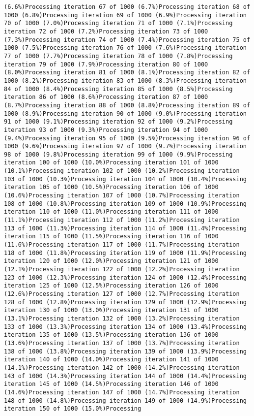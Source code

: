 \documentclass[
]{article}
\begin{document}
\begin{verbatim}
(6.6%)Processing iteration 67 of 1000 (6.7%)Processing iteration 68 of 1000 (6.8%)Processing iteration 69 of 1000 (6.9%)Processing iteration 70 of 1000 (7.0%)Processing iteration 71 of 1000 (7.1%)Processing iteration 72 of 1000 (7.2%)Processing iteration 73 of 1000 (7.3%)Processing iteration 74 of 1000 (7.4%)Processing iteration 75 of 1000 (7.5%)Processing iteration 76 of 1000 (7.6%)Processing iteration 77 of 1000 (7.7%)Processing iteration 78 of 1000 (7.8%)Processing iteration 79 of 1000 (7.9%)Processing iteration 80 of 1000 (8.0%)Processing iteration 81 of 1000 (8.1%)Processing iteration 82 of 1000 (8.2%)Processing iteration 83 of 1000 (8.3%)Processing iteration 84 of 1000 (8.4%)Processing iteration 85 of 1000 (8.5%)Processing iteration 86 of 1000 (8.6%)Processing iteration 87 of 1000 (8.7%)Processing iteration 88 of 1000 (8.8%)Processing iteration 89 of 1000 (8.9%)Processing iteration 90 of 1000 (9.0%)Processing iteration 91 of 1000 (9.1%)Processing iteration 92 of 1000 (9.2%)Processing iteration 93 of 1000 (9.3%)Processing iteration 94 of 1000 (9.4%)Processing iteration 95 of 1000 (9.5%)Processing iteration 96 of 1000 (9.6%)Processing iteration 97 of 1000 (9.7%)Processing iteration 98 of 1000 (9.8%)Processing iteration 99 of 1000 (9.9%)Processing iteration 100 of 1000 (10.0%)Processing iteration 101 of 1000 (10.1%)Processing iteration 102 of 1000 (10.2%)Processing iteration 103 of 1000 (10.3%)Processing iteration 104 of 1000 (10.4%)Processing iteration 105 of 1000 (10.5%)Processing iteration 106 of 1000 (10.6%)Processing iteration 107 of 1000 (10.7%)Processing iteration 108 of 1000 (10.8%)Processing iteration 109 of 1000 (10.9%)Processing iteration 110 of 1000 (11.0%)Processing iteration 111 of 1000 (11.1%)Processing iteration 112 of 1000 (11.2%)Processing iteration 113 of 1000 (11.3%)Processing iteration 114 of 1000 (11.4%)Processing iteration 115 of 1000 (11.5%)Processing iteration 116 of 1000 (11.6%)Processing iteration 117 of 1000 (11.7%)Processing iteration 118 of 1000 (11.8%)Processing iteration 119 of 1000 (11.9%)Processing iteration 120 of 1000 (12.0%)Processing iteration 121 of 1000 (12.1%)Processing iteration 122 of 1000 (12.2%)Processing iteration 123 of 1000 (12.3%)Processing iteration 124 of 1000 (12.4%)Processing iteration 125 of 1000 (12.5%)Processing iteration 126 of 1000 (12.6%)Processing iteration 127 of 1000 (12.7%)Processing iteration 128 of 1000 (12.8%)Processing iteration 129 of 1000 (12.9%)Processing iteration 130 of 1000 (13.0%)Processing iteration 131 of 1000 (13.1%)Processing iteration 132 of 1000 (13.2%)Processing iteration 133 of 1000 (13.3%)Processing iteration 134 of 1000 (13.4%)Processing iteration 135 of 1000 (13.5%)Processing iteration 136 of 1000 (13.6%)Processing iteration 137 of 1000 (13.7%)Processing iteration 138 of 1000 (13.8%)Processing iteration 139 of 1000 (13.9%)Processing iteration 140 of 1000 (14.0%)Processing iteration 141 of 1000 (14.1%)Processing iteration 142 of 1000 (14.2%)Processing iteration 143 of 1000 (14.3%)Processing iteration 144 of 1000 (14.4%)Processing iteration 145 of 1000 (14.5%)Processing iteration 146 of 1000 (14.6%)Processing iteration 147 of 1000 (14.7%)Processing iteration 148 of 1000 (14.8%)Processing iteration 149 of 1000 (14.9%)Processing iteration 150 of 1000 (15.0%)Processing 
\end{verbatim}
\end{document}
